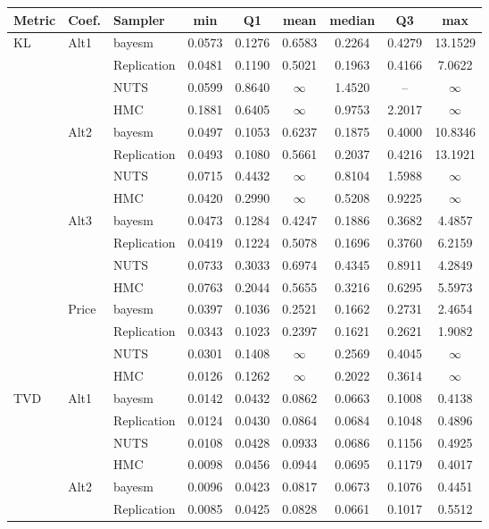 \begin{tabular}{lllcccccc}
\toprule
Metric & Coef. & Sampler & min & Q1 & mean & median & Q3 & max \\
\midrule
KL & Alt1 & bayesm & 0.0573 & 0.1276 & 0.6583 & 0.2264 & 0.4279 & 13.1529 \\
 &  & Replication & 0.0481 & 0.1190 & 0.5021 & 0.1963 & 0.4166 & 7.0622 \\
 &  & NUTS & 0.0599 & 0.8640 & $\infty$ & 1.4520 & {--} & $\infty$ \\
 &  & HMC & 0.1881 & 0.6405 & $\infty$ & 0.9753 & 2.2017 & $\infty$ \\
 & Alt2 & bayesm & 0.0497 & 0.1053 & 0.6237 & 0.1875 & 0.4000 & 10.8346 \\
 &  & Replication & 0.0493 & 0.1080 & 0.5661 & 0.2037 & 0.4216 & 13.1921 \\
 &  & NUTS & 0.0715 & 0.4432 & $\infty$ & 0.8104 & 1.5988 & $\infty$ \\
 &  & HMC & 0.0420 & 0.2990 & $\infty$ & 0.5208 & 0.9225 & $\infty$ \\
 & Alt3 & bayesm & 0.0473 & 0.1284 & 0.4247 & 0.1886 & 0.3682 & 4.4857 \\
 &  & Replication & 0.0419 & 0.1224 & 0.5078 & 0.1696 & 0.3760 & 6.2159 \\
 &  & NUTS & 0.0733 & 0.3033 & 0.6974 & 0.4345 & 0.8911 & 4.2849 \\
 &  & HMC & 0.0763 & 0.2044 & 0.5655 & 0.3216 & 0.6295 & 5.5973 \\
 & Price & bayesm & 0.0397 & 0.1036 & 0.2521 & 0.1662 & 0.2731 & 2.4654 \\
 &  & Replication & 0.0343 & 0.1023 & 0.2397 & 0.1621 & 0.2621 & 1.9082 \\
 &  & NUTS & 0.0301 & 0.1408 & $\infty$ & 0.2569 & 0.4045 & $\infty$ \\
 &  & HMC & 0.0126 & 0.1262 & $\infty$ & 0.2022 & 0.3614 & $\infty$ \\
TVD & Alt1 & bayesm & 0.0142 & 0.0432 & 0.0862 & 0.0663 & 0.1008 & 0.4138 \\
 &  & Replication & 0.0124 & 0.0430 & 0.0864 & 0.0684 & 0.1048 & 0.4896 \\
 &  & NUTS & 0.0108 & 0.0428 & 0.0933 & 0.0686 & 0.1156 & 0.4925 \\
 &  & HMC & 0.0098 & 0.0456 & 0.0944 & 0.0695 & 0.1179 & 0.4017 \\
 & Alt2 & bayesm & 0.0096 & 0.0423 & 0.0817 & 0.0673 & 0.1076 & 0.4451 \\
 &  & Replication & 0.0085 & 0.0425 & 0.0828 & 0.0661 & 0.1017 & 0.5512 \\

\end{tabular}
